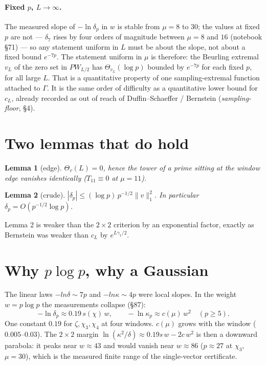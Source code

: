 \documentclass[11pt]{article}
\newtheorem{lemma}{Lemma}
\theoremstyle{remark}\newtheorem*{remark}{Remark}
\begin{document}
\paragraph{Fixed $p$, $L\to\infty$.}
The measured slope of $-\ln\delta_p$ in $w$ is stable from $\mu=8$ to $30$; the values at fixed $p$ are not --- $\delta_7$ rises by four orders of magnitude between $\mu=8$ and $16$ (notebook \S71) --- so any statement uniform in $L$ must be about the slope, not about a fixed bound $e^{-7p}$. The statement
uniform in $\mu$ is therefore: the Beurling extremal $v_L$ of the
zero set in $PW_{L/2}$ has $\Theta_{v_L}(\log p)$ bounded by $e^{-7p}$
for each fixed $p$, for all large $L$. That is a quantitative property
of one sampling-extremal function attached to $\Gamma$. It is the same
order of difficulty as a quantitative lower bound for $c_L$, already
recorded as out of reach of Duffin--Schaeffer / Bernstein
(\emph{sampling-floor}, \S4).

\section{Two lemmas that do hold}
\begin{lemma}[edge]
$\Theta_v(L)=0$, hence the tower of a prime sitting at the window edge
vanishes identically ($T_{11}\equiv0$ at $\mu=11$).
\end{lemma}
\begin{lemma}[crude]
$|\delta_p|\le(\log p)\,p^{-1/2}\|v\|_1^2$. In particular $\delta_p=O(p^{-1/2}\log p)$.
\end{lemma}
Lemma 2 is weaker than the $2\times2$ criterion by an exponential
factor, exactly as Bernstein was weaker than $c_L$ by $e^{L\gamma_1/2}$.

\section{Why $p\log p$, why a Gaussian}
The linear laws $-ln\delta\sim7p$ and $-ln\kappa\sim4p$ were local
slopes. In the weight $w=p\log p$ the measurements collapse
(\S87):
\[
-\ln\delta_p\approx0.19\,s(\chi)\,w,\qquad
-\ln\kappa_p\approx c(\mu)\,w^2\quad(p\ge5).
\]
One constant $0.19$ for $\zeta,\chi_3,\chi_4$ at four windows. $c(\mu)$
grows with the window ($0.005$--$0.03$). The $2\times2$ margin
$\ln(\kappa^2/\delta)\approx0.19 s\,w-2c\,w^2$ is then a downward
parabola: it peaks near $w\approx43$ and would vanish near $w\approx86$
($p\approx27$ at $\chi_3$, $\mu=30$), which is the measured finite
range of the single-vector certificate.
\end{document}
